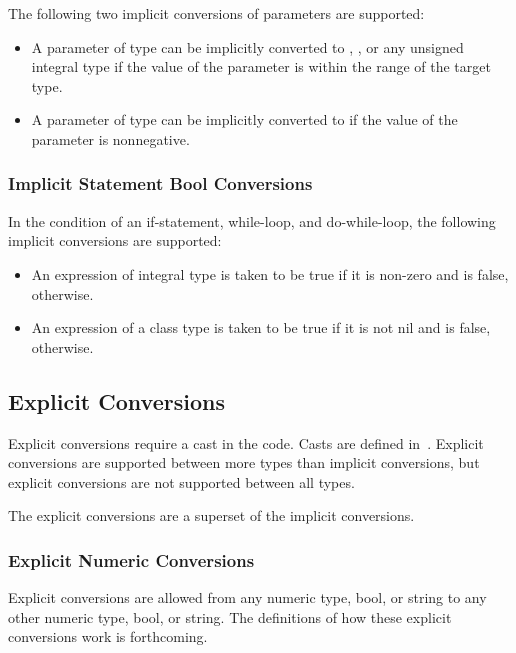 The following two implicit conversions of parameters are supported:
\begin{itemize}
\item A parameter of type  can be implicitly converted
to , , or any unsigned integral type if the
value of the parameter is within the range of the target type.
\item A parameter of type  can be implicitly converted
to  if the value of the parameter is nonnegative.
\end{itemize}

\subsubsection{Implicit Statement Bool Conversions}
\label{Implicit_Statement_Bool_Conversions}

In the condition of an if-statement, while-loop, and do-while-loop,
the following implicit conversions are supported:
\begin{itemize}
\item An expression of integral type is taken to be true if it is non-zero and is false, otherwise.
\item An expression of a class type is taken to be true if it is not nil and is false, otherwise.
\end{itemize}

\subsection{Explicit Conversions}
\label{Explicit_Conversions}

Explicit conversions require a cast in the code.  Casts are defined
in~.  Explicit conversions are supported between more
types than implicit conversions, but explicit conversions are not
supported between all types.

The explicit conversions are a superset of the implicit conversions.

\subsubsection{Explicit Numeric Conversions}
\label{Explicit_Numeric_Conversions}

Explicit conversions are allowed from any numeric type, bool, or
string to any other numeric type, bool, or string.  The definitions of
how these explicit conversions work is forthcoming.

